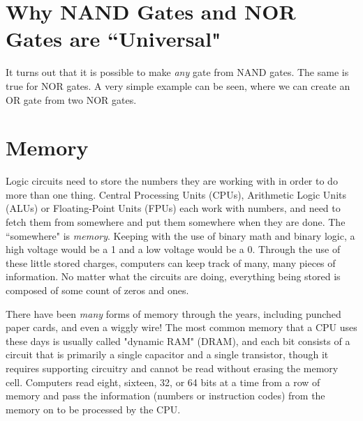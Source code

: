 \clearpage
\newpage
\section*{Why NAND Gates and NOR Gates are ``Universal"}

It turns out that it is possible to make \emph{any} gate from NAND gates. The same is true for NOR gates. A very simple example can be seen, where we can create an OR gate from two NOR gates. 






\newpage
\section*{Memory}

Logic circuits need to store the numbers they are working with in order to do more than one thing. Central Processing Units (CPUs), Arithmetic Logic Units (ALUs) or Floating-Point Units (FPUs) each work with numbers, and need to fetch them from somewhere and put them somewhere when they are done. The ``somewhere" is \emph{memory}. Keeping with the use of binary math and binary logic, a high voltage would be a 1 and a low voltage would be a 0. Through the use of these little stored charges, computers can keep track of many, many pieces of information. No matter what the circuits are doing, everything being stored is composed of some count of zeros and ones. 

There have been \emph{many} forms of memory through the years, including punched paper cards, and even a wiggly wire! The most common memory that a CPU uses these days is usually called "dynamic RAM" (DRAM), and each bit consists of a circuit that is primarily a single capacitor and a single transistor, though it requires supporting circuitry and cannot be read without erasing the memory cell. Computers read eight, sixteen, 32, or 64 bits at a time from a row of memory and pass the information (numbers or instruction codes) from the memory on to be processed by the CPU.

